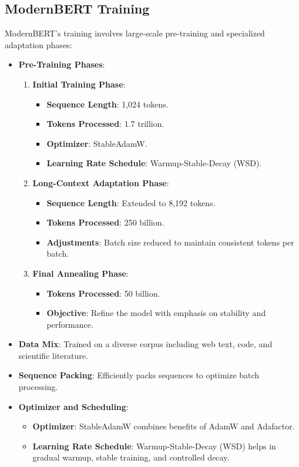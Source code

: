 \documentclass{article}
\begin{document}
\subsection{ModernBERT Training}  
  
ModernBERT's training involves large-scale pre-training and specialized adaptation phases:  
  
\begin{itemize}  
    \item \textbf{Pre-Training Phases}:  
    \begin{enumerate}  
        \item \textbf{Initial Training Phase}:  
        \begin{itemize}  
            \item \textbf{Sequence Length}: 1,024 tokens.  
            \item \textbf{Tokens Processed}: 1.7 trillion.  
            \item \textbf{Optimizer}: StableAdamW.  
            \item \textbf{Learning Rate Schedule}: Warmup-Stable-Decay (WSD).  
        \end{itemize}  
        \item \textbf{Long-Context Adaptation Phase}:  
        \begin{itemize}  
            \item \textbf{Sequence Length}: Extended to 8,192 tokens.  
            \item \textbf{Tokens Processed}: 250 billion.  
            \item \textbf{Adjustments}: Batch size reduced to maintain consistent tokens per batch.  
        \end{itemize}  
        \item \textbf{Final Annealing Phase}:  
        \begin{itemize}  
            \item \textbf{Tokens Processed}: 50 billion.  
            \item \textbf{Objective}: Refine the model with emphasis on stability and performance.  
        \end{itemize}  
    \end{enumerate}  
    \item \textbf{Data Mix}: Trained on a diverse corpus including web text, code, and scientific literature.  
    \item \textbf{Sequence Packing}: Efficiently packs sequences to optimize batch processing.  
    \item \textbf{Optimizer and Scheduling}:  
    \begin{itemize}  
        \item \textbf{Optimizer}: StableAdamW combines benefits of AdamW and Adafactor.  
        \item \textbf{Learning Rate Schedule}: Warmup-Stable-Decay (WSD) helps in gradual warmup, stable training, and controlled decay.  
    \end{itemize}  
\end{itemize}  
  
\end{document}
